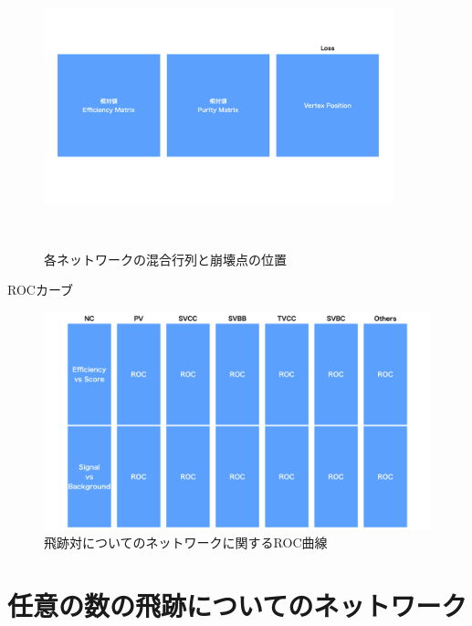 \begin{figure}[htbp]
   \begin{minipage}{1.0\textwidth}
   \centering
    \includegraphics[trim = 0 220 0 220, width=0.9\textwidth, clip]{Figure/3Networks/3-3-3-2ConfusionMatrixD.png}
    \label{3-3-3-2ConfusionMatrixD}
   \end{minipage}
  \caption{各ネットワークの混合行列と崩壊点の位置}
  \label{3-3-3-2ConfusionMatrices}
\end{figure}

ROCカーブ\\

\begin{figure}[htbp]
 \centering
 \includegraphics[width=1.0\textwidth]{Figure/3Networks/3-3-3-3ROCCurve.png}
 \caption{飛跡対についてのネットワークに関するROC曲線}
 \label{3-3-3-3ROCCurve}
\end{figure}



\section{任意の数の飛跡についてのネットワーク} \label{Net:VertexLSTM}

